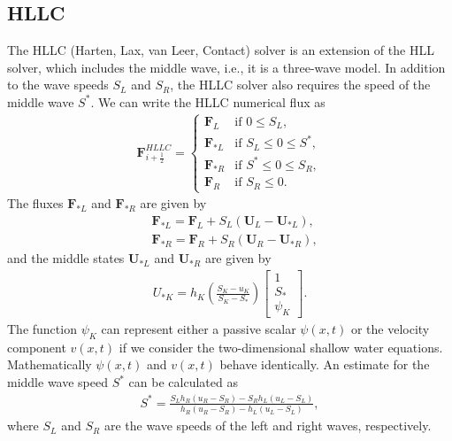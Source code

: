 \subsection*{HLLC}
The HLLC (Harten, Lax, van Leer, Contact) solver is an extension of the HLL solver, which includes the middle wave, i.e., it is a three-wave model.
In addition to the wave speeds $S_L$ and $S_R$, the HLLC solver also requires the speed of the middle wave $S^*$.
We can write the HLLC numerical flux as
\begin{align*}
    \mathbf{F}_{i+\frac{1}{2}}^{HLLC} = \begin{cases}
        \mathbf{F}_L & \text{if } 0 \leq S_L, \\
        \mathbf{F}_{*L} & \text{if } S_L \leq 0 \leq S^*, \\
        \mathbf{F}_{*R} & \text{if } S^* \leq 0 \leq S_R, \\
        \mathbf{F}_R & \text{if } S_R \leq 0.
    \end{cases}
\end{align*}
The fluxes $\mathbf{F}_{*L}$ and $\mathbf{F}_{*R}$ are given by
\begin{align*}
    &\mathbf{F}_{*L} = \mathbf{F}_L + S_L (\mathbf{U}_L - \mathbf{U}_{*L}),\\
    &\mathbf{F}_{*R} = \mathbf{F}_R + S_R (\mathbf{U}_R - \mathbf{U}_{*R}),
\end{align*}
and the middle states $\mathbf{U}_{*L}$ and $\mathbf{U}_{*R}$ are given by
\begin{align*}
    U_{*K} = h_K \left( \frac{S_K - u_K}{S_K - S_*}  \right)
    \begin{bmatrix}
        1 \\ S_* \\ \psi_K
    \end{bmatrix}.
\end{align*}
The function $\psi_K$ can represent either a passive scalar $\psi(x,t)$ or the velocity component $v(x,t)$ if we consider the two-dimensional shallow water equations.
Mathematically $\psi(x,t)$ and $v(x,t)$ behave identically.
An estimate for the middle wave speed $S^*$ can be calculated as
\begin{align*}
    S^* = \frac{S_L h_R(u_R - S_R) - S_R h_L (u_L - S_L)}{h_R (u_R - S_R) - h_L (u_L - S_L)},
\end{align*}
where $S_L$ and $S_R$ are the wave speeds of the left and right waves, respectively.

